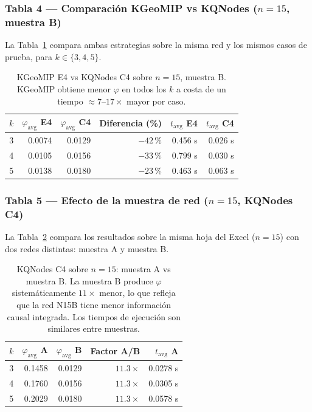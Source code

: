 \subsubsection*{Tabla 4 — Comparación KGeoMIP vs KQNodes ($n=15$, muestra B)}

La Tabla~\ref{tab:comparacion_estrategias} compara ambas estrategias sobre
la misma red y los mismos casos de prueba, para $k \in \{3,4,5\}$.

\begin{table}[H]
\centering
\begin{tabular}{rrrrrr}
  \toprule
  $k$ &
  $\varphi_{\mathrm{avg}}$ E4 & $\varphi_{\mathrm{avg}}$ C4 & Diferencia (\%) &
  $t_{\mathrm{avg}}$ E4 & $t_{\mathrm{avg}}$ C4 \\
  \midrule
  3 & 0.0074 & 0.0129 & $-42$\,\% & 0.456 s & 0.026 s \\
  4 & 0.0105 & 0.0156 & $-33$\,\% & 0.799 s & 0.030 s \\
  5 & 0.0138 & 0.0180 & $-23$\,\% & 0.463 s & 0.063 s \\
  \bottomrule
\end{tabular}
\caption{KGeoMIP E4 vs KQNodes C4 sobre $n=15$, muestra B.
  KGeoMIP obtiene menor $\varphi$ en todos los $k$ a costa de un tiempo
  $\approx 7$--$17\times$ mayor por caso.}
\label{tab:comparacion_estrategias}
\end{table}

\subsubsection*{Tabla 5 — Efecto de la muestra de red ($n=15$, KQNodes C4)}

La Tabla~\ref{tab:efecto_muestra} compara los resultados sobre la misma
hoja del Excel ($n=15$) con dos redes distintas: muestra A y muestra B.

\begin{table}[H]
\centering
\begin{tabular}{rrrrr}
  \toprule
  $k$ &
  $\varphi_{\mathrm{avg}}$ A & $\varphi_{\mathrm{avg}}$ B & Factor A/B &
  $t_{\mathrm{avg}}$ A \\
  \midrule
  3 & 0.1458 & 0.0129 & $11.3\times$ & 0.0278 s \\
  4 & 0.1760 & 0.0156 & $11.3\times$ & 0.0305 s \\
  5 & 0.2029 & 0.0180 & $11.3\times$ & 0.0578 s \\
  \bottomrule
\end{tabular}
\caption{KQNodes C4 sobre $n=15$: muestra A vs muestra B.
  La muestra B produce $\varphi$ sistemáticamente $11\times$ menor,
  lo que refleja que la red N15B tiene menor información causal integrada.
  Los tiempos de ejecución son similares entre muestras.}
\label{tab:efecto_muestra}
\end{table}

